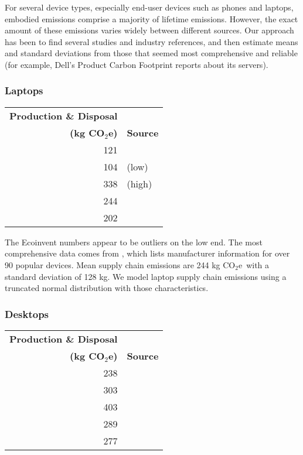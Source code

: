 \documentclass[11pt]{article}
\newcommand{\assumption}[1]{{#1}}
\newcommand{\coe}{CO$_2$e}
\newcommand{\gcoe}{g \coe}
\newcommand{\kgcoe}{k\gcoe}
\begin{document}
For several device types, especially end-user devices such as phones and laptops, embodied emissions
comprise a majority of lifetime emissions. However, the exact amount of these emissions varies
widely between different sources. Our approach has been to find several studies and industry references,
and then estimate means and standard deviations from those that seemed most comprehensive and reliable
(for example, Dell's Product Carbon Footprint reports about its servers).

\subsubsection{Laptops}

\begin{center}
\begin{tabular}{|r|l|}
\hline
\textbf{Production \& Disposal} & \\
\textbf{(\kgcoe)} & \textbf{Source} \\ \hline
121 & \textcite{ecoinvent}  \\ \hline
104 & \textcite{teehan2013} (low) \\ \hline
338 & \textcite{teehan2013} (high) \\ \hline
244 & \textcite{rarecoil} \\ \hline
202 & \textcite{unctadder2024} \\ \hline
\end{tabular}
\label{tab:embodied_emissions:laptops}
\end{center}

The Ecoinvent numbers appear to be outliers on the low end.
The most comprehensive data comes from \textcite{rarecoil}, which lists manufacturer
information for over 90 popular devices. Mean supply chain emissions are
244 \kgcoe\ with a standard deviation of 128 kg.
\assumption{We model laptop supply chain emissions using a truncated normal distribution with those characteristics.}

\subsubsection{Desktops}

\begin{center}
\begin{tabular}{|r|l|}
\hline
\textbf{Production \& Disposal} & \\
\textbf{(\kgcoe)} & \textbf{Source} \\ \hline
238 & \textcite{ecoinvent} \\ \hline
303 & \textcite{teehan2013} \\ \hline
403 & \textcite{unctadder2024} \\ \hline
289 & \textcite{dellpcf} \\ \hline
277 & \textcite{boavizta} \\ \hline
\end{tabular}
\label{tab:embodied_emissions:desktops}
\end{center}
\end{document}
